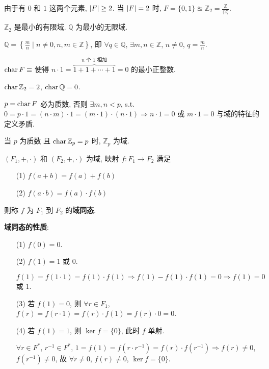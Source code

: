 \documentclass{note}
\begin{document}
由于有 $0$ 和 $1$ 这两个元素, $\left\lvert F\right\rvert\geq 2$. 当 $\left\lvert F\right\rvert=2$ 时, $F=\{0,1\}\approxeq\mathbb{Z}_2=\frac{\mathbb{Z}}{\langle 2\rangle}$.

\begin{eg}
    $\mathbb{Z}_2$ 是最小的有限域. $\mathbb{Q}$ 为最小的无限域.
\end{eg}

\begin{df}[有理数]
    $\mathbb{Q}=\left\{\frac{m}{n}\mid n\neq 0,n,m\in\mathbb{Z}\right\}$, 即 $\forall q\in\mathbb{Q}$, $\exists m,n\in\mathbb{Z}$, $n\neq 0$, $q=\frac{m}{n}$.
\end{df}

\begin{df}[域的特征]
    $\operatorname{char} F\equiv$ 使得 $n\cdot 1=\overbrace{1+1+\cdots+1}^{\text{$n$ 个 $1$ 相加}}=0$ 的最小正整数.
\end{df}

\begin{eg}
    $\operatorname{char}\mathbb{Z}_2=2$, $\operatorname{char}\mathbb{Q}=0$.
\end{eg}

$p=\operatorname{char} F$ 必为质数, 否则 $\exists m,n<p$, s.t. $0=p\cdot 1=(n\cdot m)\cdot 1=(m\cdot 1)\cdot(n\cdot 1)\Longrightarrow n\cdot 1=0$ 或 $m\cdot 1=0$ 与域的特征的定义矛盾.

当 $p$ 为质数 且 $\operatorname{char}\mathbb{Z}_p=p$ 时, $\mathbb{Z}_p$ 为域.

\begin{df}[域同态]
    $(F_1,+,\cdot)$ 和 $(F_2,+,\cdot)$ 为域, 映射 $f:F_1\rightarrow F_2$ 满足
    \begin{itemize}
        \item[(1)] $f(a+b)=f(a)+f(b)$
        \item[(2)] $f(a\cdot b)=f(a)\cdot f(b)$
    \end{itemize}
    则称 $f$ 为 $F_1$ 到 $F_2$ 的\textbf{域同态}.
\end{df}

\textbf{域同态的性质}:
\begin{itemize}
    \item[(1)] $f(0)=0$.
    \item[(2)] $f(1)=1$ 或 $0$.
    \begin{pf}
        $f(1)=f(1\cdot 1)=f(1)\cdot f(1)\Longrightarrow f(1)-f(1)\cdot f(1)=0\Longrightarrow f(1)=0$ 或 $1$.
    \end{pf}
    \item[(3)] 若 $f(1)=0$, 则 $\forall r\in F_1$, $f(r)=f(r\cdot 1)=f(r)\cdot f(1)=f(r)\cdot 0=0$.
    \item[(4)] 若 $f(1)=1$, 则 $\ker f=\{0\}$, 此时 $f$ 单射.
    \begin{pf}
        $\forall r\in F^*$, $r^{-1}\in F^*$, $1=f(1)=f(r\cdot r^{-1})=f(r)\cdot f(r^{-1})\Longrightarrow f(r)\neq 0$, $f(r^{-1})\neq 0$, 故 $\forall r\neq 0$, $f(r)\neq 0$, $\ker f=\{0\}$.
    \end{pf}
\end{itemize}
\ifx\allfiles\undefined
\end{document}
